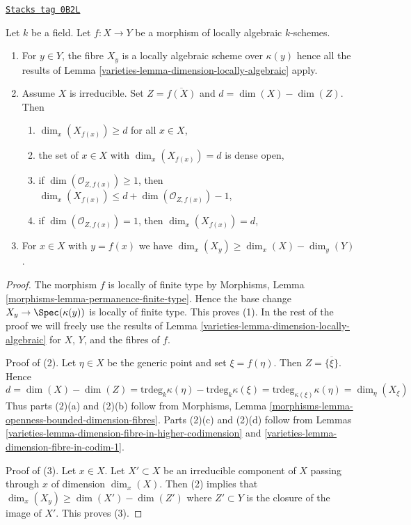 \begin{lemma}
\label{varieties-lemma-dimension-fibres-locally-algebraic}
\href{https://stacks.math.columbia.edu/tag/0B2L}{\texttt{Stacks tag 0B2L}}

Let $k$ be a field. Let $f : X \to Y$ be a morphism of locally algebraic
$k$-schemes.
\begin{enumerate}
\item For $y \in Y$, the fibre $X_y$ is a locally
algebraic scheme over $\kappa(y)$ hence all the results of
Lemma \ref{varieties-lemma-dimension-locally-algebraic} apply.
\item Assume $X$ is irreducible. Set $Z = \overline{f(X)}$ and
$d = \dim(X) - \dim(Z)$. Then
\begin{enumerate}
\item $\dim_x(X_{f(x)}) \geq d$ for all $x \in X$,
\item the set of $x \in X$ with $\dim_x(X_{f(x)}) = d$ is dense open,
\item if $\dim(\mathcal{O}_{Z, f(x)}) \geq 1$, then
$\dim_x(X_{f(x)}) \leq d + \dim(\mathcal{O}_{Z, f(x)}) - 1$,
\item if $\dim(\mathcal{O}_{Z, f(x)}) = 1$, then $\dim_x(X_{f(x)}) = d$,
\end{enumerate}
\item For $x \in X$ with $y = f(x)$ we have
$\dim_x(X_y) \geq \dim_x(X) - \dim_y(Y)$.
\end{enumerate}
\end{lemma}

\begin{proof}

The morphism $f$ is locally of finite type by
Morphisms, Lemma \ref{morphisms-lemma-permanence-finite-type}.
Hence the base change $X_y \to \Spec(\kappa(y))$ is locally
of finite type. This proves (1).
In the rest of the proof we will freely use the results
of Lemma \ref{varieties-lemma-dimension-locally-algebraic} for $X$, $Y$, and
the fibres of $f$.

\medskip\noindent
Proof of (2). Let $\eta \in X$ be the generic point and set
$\xi = f(\eta)$. Then $Z = \overline{\{\xi\}}$. Hence
$$
d = \dim(X) - \dim(Z) =
\text{trdeg}_k \kappa(\eta) - \text{trdeg}_k \kappa(\xi) =
\text{trdeg}_{\kappa(\xi)} \kappa(\eta) = \dim_\eta(X_\xi)
$$
Thus parts (2)(a) and (2)(b) follow from
Morphisms, Lemma \ref{morphisms-lemma-openness-bounded-dimension-fibres}.
Parts (2)(c) and (2)(d) follow from
Lemmas \ref{varieties-lemma-dimension-fibre-in-higher-codimension} and
\ref{varieties-lemma-dimension-fibre-in-codim-1}.

\medskip\noindent
Proof of (3). Let $x \in X$. Let $X' \subset X$ be an irreducible component
of $X$ passing through $x$ of dimension $\dim_x(X)$. Then (2) implies that
$\dim_x(X_y) \geq \dim(X') - \dim(Z')$ where $Z' \subset Y$
is the closure of the image of $X'$. This proves (3).
\end{proof}

